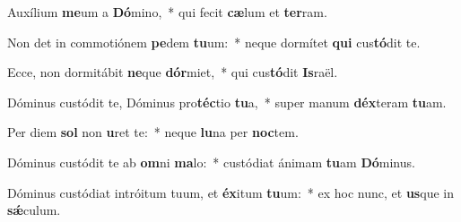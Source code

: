 \item Auxílium \textbf{me}um a \textbf{Dó}mino,~* qui fecit \textbf{cæ}lum et \textbf{ter}ram.
\item Non det in commotiónem \textbf{pe}dem \textbf{tu}um:~* neque dormítet \textbf{qui} cus\textbf{tó}dit te.
\item Ecce, non dormitábit \textbf{ne}que \textbf{dór}miet,~* qui cus\textbf{tó}dit \textbf{Is}raël.
\item Dóminus custódit te, Dóminus pro\textbf{téc}tio \textbf{tu}a,~* super manum \textbf{déx}teram \textbf{tu}am.
\item Per diem \textbf{sol} non \textbf{u}ret te:~* neque \textbf{lu}na per \textbf{noc}tem.
\item Dóminus custódit te ab \textbf{om}ni \textbf{ma}lo:~* custódiat ánimam \textbf{tu}am \textbf{Dó}minus.
\item Dóminus custódiat intróitum tuum, et \textbf{éx}itum \textbf{tu}um:~* ex hoc nunc, et \textbf{us}que in \textbf{sǽ}culum.
